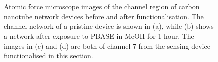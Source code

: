 \documentclass[
  a4paper,
]{scrbook}
\begin{document}
\begin{figure}
\begin{minipage}[t]{0.03\linewidth}
{{}

}

\end{minipage}%
%
\begin{minipage}[t]{0.01\linewidth}

{\centering 

~

}

\end{minipage}%
%
\begin{minipage}[t]{0.45\linewidth}

{\centering 


}

\end{minipage}%
%
\begin{minipage}[t]{0.01\linewidth}

{\centering 

~

}

\end{minipage}%

\caption{\label{fig-working-OR22a-AFM}Atomic force microscope images of
the channel region of carbon nanotube network devices before and after
functionalisation. The channel network of a pristine device is shown in
(a), while (b) shows a network after exposure to PBASE in MeOH for 1
hour. The images in (c) and (d) are both of channel 7 from the sensing
device functionalised in this section.}

\end{figure}
\end{document}
